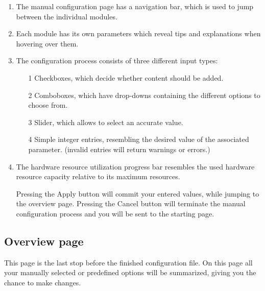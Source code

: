 \begin{enumerate}
	\item The manual configuration page has a navigation bar, which is used to jump between the individual modules.
	\item Each module has its own parameters which reveal tips and explanations when hovering over them.
	\item The configuration process consists of three different input types:

	\begin{enumerate}
		\item[1] Checkboxes, which decide whether content should be added.
		\item[2] Comboboxes, which have drop-downs containing the different options to choose from.
		\item[3] Slider, which allows to select an accurate value.
		\item[4] Simple integer entries, resembling the desired value of the associated parameter.
  (invalid entries will return warnings or errors.)
	\end{enumerate}
	\item The hardware resource utilization progress bar resembles the used hardware resource capacity relative to its maximum resources.

		Pressing the \glqq Apply \grqq{} button will commit your entered values, while jumping to the overview page.
		Pressing the \glqq Cancel \grqq{} button will terminate the manual configuration process and you will be sent to the starting page.

\end{enumerate}
\newpage
\subsection{Overview page}

This page is the last stop before the finished configuration file. On this page all your manually selected or predefined options will be summarized, giving you the chance to make changes.

